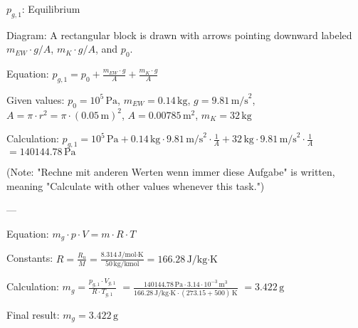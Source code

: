 \( p_{g,1} \): Equilibrium  

Diagram: A rectangular block is drawn with arrows pointing downward labeled \( m_{EW} \cdot g / A \), \( m_{K} \cdot g / A \), and \( p_0 \).  

Equation:  
\( p_{g,1} = p_0 + \frac{m_{EW} \cdot g}{A} + \frac{m_{K} \cdot g}{A} \)  

Given values:  
\( p_0 = 10^5 \, \text{Pa} \), \( m_{EW} = 0.14 \, \text{kg} \), \( g = 9.81 \, \text{m/s}^2 \), \( A = \pi \cdot r^2 = \pi \cdot (0.05 \, \text{m})^2 \), \( A = 0.00785 \, \text{m}^2 \), \( m_{K} = 32 \, \text{kg} \)  

Calculation:  
\( p_{g,1} = 10^5 \, \text{Pa} + 0.14 \, \text{kg} \cdot 9.81 \, \text{m/s}^2 \cdot \frac{1}{A} + 32 \, \text{kg} \cdot 9.81 \, \text{m/s}^2 \cdot \frac{1}{A} \)  
\( = 140144.78 \, \text{Pa} \)  

(Note: "Rechne mit anderen Werten wenn immer diese Aufgabe" is written, meaning "Calculate with other values whenever this task.")  

---

Equation:  
\( m_g \cdot p \cdot V = m \cdot R \cdot T \)  

Constants:  
\( R = \frac{R_u}{M} = \frac{8.314 \, \text{J/mol·K}}{50 \, \text{kg/kmol}} = 166.28 \, \text{J/kg·K} \)  

Calculation:  
\( m_g = \frac{p_{g,1} \cdot V_{g,1}}{R \cdot T_{g,1}} \)  
\( = \frac{140144.78 \, \text{Pa} \cdot 3.14 \cdot 10^{-3} \, \text{m}^3}{166.28 \, \text{J/kg·K} \cdot (273.15 + 500) \, \text{K}} \)  
\( = 3.422 \, \text{g} \)  

Final result:  
\( m_g = 3.422 \, \text{g} \)